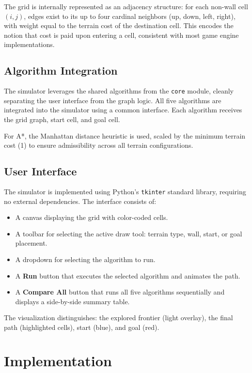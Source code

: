 \documentclass[12pt, a4paper, oneside]{report}
\theoremstyle{definition}
\begin{document}
The grid is internally represented as an adjacency structure: for each non-wall cell $(i, j)$, edges exist to its up to four cardinal neighbors (up, down, left, right), with weight equal to the terrain cost of the destination cell. This encodes the notion that cost is paid upon entering a cell, consistent with most game engine implementations.

\subsection{Algorithm Integration}

The simulator leverages the shared algorithms from the \texttt{core} module, cleanly separating the user interface from the graph logic. All five algorithms are integrated into the simulator using a common interface. Each algorithm receives the grid graph, start cell, and goal cell.

For A*, the Manhattan distance heuristic is used, scaled by the minimum terrain cost (1) to ensure admissibility across all terrain configurations.

\subsection{User Interface}

The simulator is implemented using Python's \texttt{tkinter} standard library, requiring no external dependencies. The interface consists of:

\begin{itemize}
    \item A canvas displaying the grid with color-coded cells.
    \item A toolbar for selecting the active draw tool: terrain type, wall, start, or goal placement.
    \item A dropdown for selecting the algorithm to run.
    \item A \textbf{Run} button that executes the selected algorithm and animates the path.
    \item A \textbf{Compare All} button that runs all five algorithms sequentially and displays a side-by-side summary table.
\end{itemize}

The visualization distinguishes: the explored frontier (light overlay), the final path (highlighted cells), start (blue), and goal (red).

\section{Implementation}
\end{document}
